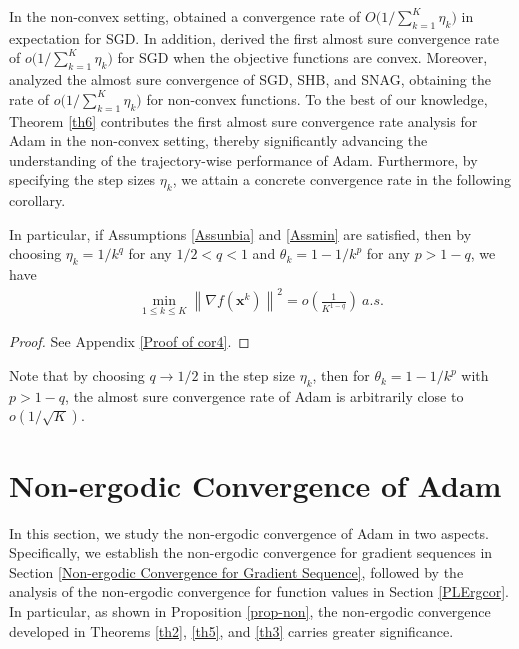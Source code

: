 \documentclass[twoside,11pt]{article}
\begin{document}
\par In the non-convex setting, \citet{lei2019stochastic} obtained a convergence rate of $O\big( {1}/{\sum_{k=1}^{K}\eta_{k}}\big)$ in expectation for SGD. In addition, 
\citet{sebbouh2021almost} derived the first almost sure convergence rate of $o\big( {1}/{\sum_{k=1}^{K}\eta_{k}}\big)$ for SGD when the objective functions are convex. Moreover, \citet{liu2022almost} analyzed the almost sure convergence of SGD, SHB, and SNAG, obtaining the rate of $o\big({1}/{\sum_{k=1}^{K}\eta_{k}}\big)$ for non-convex functions. To the best of our knowledge, Theorem \ref{th6} contributes the first almost sure convergence rate analysis for Adam in the non-convex setting, thereby significantly advancing the understanding of the trajectory-wise performance of Adam. Furthermore, by specifying the step sizes $\eta_{k}$, we attain a concrete convergence rate in the following corollary. 
	
\begin{corollary}\label{cor4}
In particular, if Assumptions \ref{Assunbia} and \ref{Assmin} are satisfied, then by choosing  $\eta_k=1/k^{q}$ for any $1/2<q< 1$ and $\theta_k=1-1/k^{p}$ for any $p>1-q$, we have
\begin{equation}
	\begin{aligned}
		\min_{1\le k\le K}\left\| \nabla f(\mathbf{x}^k)\right\|^2=o\left( \frac{1}{K^{1-q}}\right) \ a.s. \nonumber
	\end{aligned}
	\end{equation}
\end{corollary}
\begin{proof}
See Appendix \ref{Proof of cor4}.
\end{proof}
\par Note that by choosing $q\to 1/2$ in the step size $\eta_{k}$, then for $\theta_{k}=1-1/k^{p}$ with $p>1-q$, the almost sure convergence rate of Adam is arbitrarily close to  $o(1/\sqrt{K})$.	


	
\section{Non-ergodic Convergence of Adam}\label{Non-ergodic Convergence of Adam}
In this section, we study the non-ergodic convergence of Adam in two aspects. Specifically, we establish the non-ergodic convergence for gradient sequences in Section \ref{Non-ergodic Convergence for Gradient Sequence}, followed by the analysis of the non-ergodic convergence for function values in Section \ref{PLErgcor}. In particular, as shown in Proposition \ref{prop-non}, the non-ergodic convergence developed in Theorems \ref{th2}, \ref{th5}, and \ref{th3} carries greater significance. 
\end{document}
